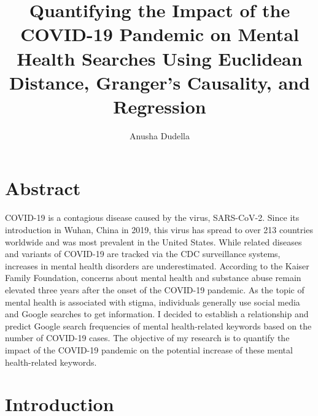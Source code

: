 \documentclass{article}
\title{Quantifying the Impact of the COVID-19 Pandemic on Mental Health Searches Using Euclidean Distance, Granger’s Causality, and Regression}
\author{Anusha Dudella}
\date{\vspace{-5ex}}
\begin{document}
\maketitle

\section{Abstract}
COVID-19 is a contagious disease caused by the virus, SARS-CoV-2. Since its introduction in Wuhan,
China in 2019, this virus has spread to over 213 countries worldwide and was most prevalent in the
United States. While related diseases and variants of COVID-19 are tracked via the CDC surveillance
systems, increases in mental health disorders are underestimated. According to the Kaiser Family
Foundation, concerns about mental health and substance abuse remain elevated three years after the
onset of the COVID-19 pandemic. As the topic of mental health is associated with stigma, individuals
generally use social media and Google searches to get information. I decided to establish a
relationship and predict Google search frequencies of mental health-related keywords based on the
number of COVID-19 cases. The objective of my research is to quantify the impact of the COVID-19
pandemic on the potential increase of these mental health-related keywords.

\section{Introduction}
\end{document}
